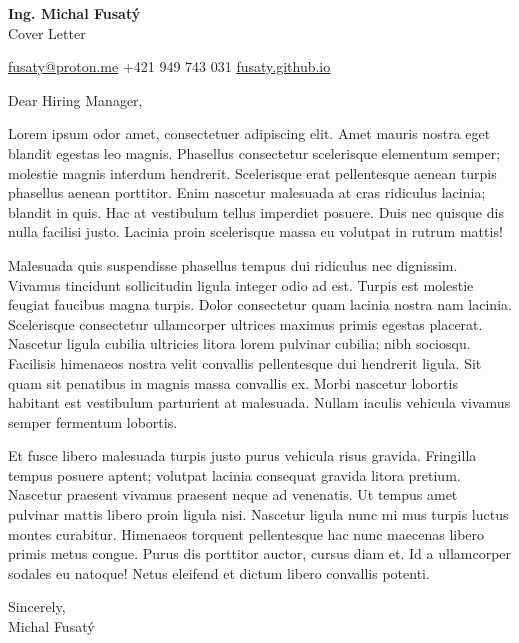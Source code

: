 \documentclass[12pt]{article}
\begin{document}

\begin{center}
	{\Large \bfseries Ing. Michal Fusatý} \\ 
	{\large Cover Letter} 	
\end{center}

\vspace{1.5em}

\begin{center}
    \noindent
    \href{mailto:fusaty@proton.me}{fusaty@proton.me} \hfill \faAngleLeft \hfill
    +421 949 743 031 \hfill \faAngleRight \hfill
    \href{https://fusaty.github.io}{fusaty.github.io} \hfill
\end{center}



\vspace{3em} %

\noindent
Dear Hiring Manager,

Lorem ipsum odor amet, consectetuer adipiscing elit. Amet mauris nostra eget blandit egestas leo magnis. Phasellus consectetur scelerisque elementum semper; molestie magnis interdum hendrerit. Scelerisque erat pellentesque aenean turpis phasellus aenean porttitor. Enim nascetur malesuada at cras ridiculus lacinia; blandit in quis. Hac at vestibulum tellus imperdiet posuere. Duis nec quisque dis nulla facilisi justo. Lacinia proin scelerisque massa eu volutpat in rutrum mattis!

Malesuada quis suspendisse phasellus tempus dui ridiculus nec dignissim. Vivamus tincidunt sollicitudin ligula integer odio ad est. Turpis est molestie feugiat faucibus magna turpis. Dolor consectetur quam lacinia nostra nam lacinia. Scelerisque consectetur ullamcorper ultrices maximus primis egestas placerat. Nascetur ligula cubilia ultricies litora lorem pulvinar cubilia; nibh sociosqu. Facilisis himenaeos nostra velit convallis pellentesque dui hendrerit ligula. Sit quam sit penatibus in magnis massa convallis ex. Morbi nascetur lobortis habitant est vestibulum parturient at malesuada. Nullam iaculis vehicula vivamus semper fermentum lobortis.

Et fusce libero malesuada turpis justo purus vehicula risus gravida. Fringilla tempus posuere aptent; volutpat lacinia consequat gravida litora pretium. Nascetur praesent vivamus praesent neque ad venenatis. Ut tempus amet pulvinar mattis libero proin ligula nisi. Nascetur ligula nunc mi mus turpis luctus montes curabitur. Himenaeos torquent pellentesque hac nunc maecenas libero primis metus congue. Purus dis porttitor auctor, cursus diam et. Id a ullamcorper sodales eu natoque! Netus eleifend et dictum libero convallis potenti.

Sincerely, \\
Michal Fusatý
\end{document}
